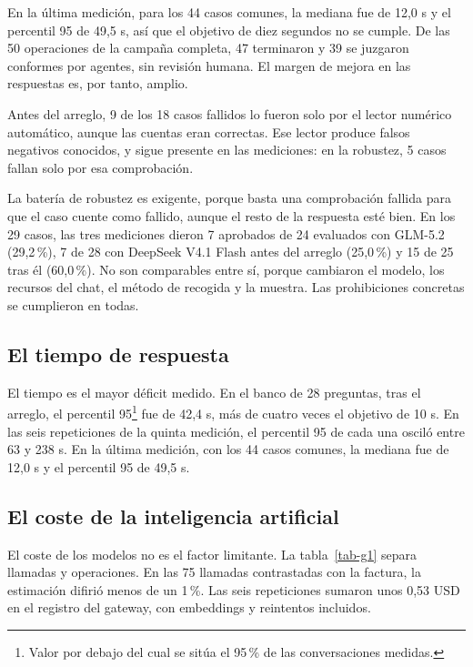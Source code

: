 En la última medición, para los 44 casos comunes, la mediana fue de 12,0 s y el percentil 95 de 49,5 s, así que el objetivo de diez segundos no se cumple. De las 50 operaciones de la campaña completa, 47 terminaron y 39 se juzgaron conformes por agentes, sin revisión humana. El margen de mejora en las respuestas es, por tanto, amplio.

Antes del arreglo, 9 de los 18 casos fallidos lo fueron solo por el lector numérico automático, aunque las cuentas eran correctas. Ese lector produce falsos negativos conocidos, y sigue presente en las mediciones: en la robustez, 5 casos fallan solo por esa comprobación.

La batería de robustez es exigente, porque basta una comprobación fallida para que el caso cuente como fallido, aunque el resto de la respuesta esté bien. En los 29 casos, las tres mediciones dieron 7 aprobados de 24 evaluados con GLM-5.2 (29,2\,\%), 7 de 28 con DeepSeek V4.1 Flash antes del arreglo (25,0\,\%) y 15 de 25 tras él (60,0\,\%). No son comparables entre sí, porque cambiaron el modelo, los recursos del chat, el método de recogida y la muestra. Las prohibiciones concretas se cumplieron en todas.

\subsection{El tiempo de respuesta}\label{h-4}

El tiempo es el mayor déficit medido. En el banco de 28 preguntas, tras el arreglo, el percentil 95\footnote{Valor por debajo del cual se sitúa el 95\,\% de las conversaciones medidas.} fue de 42,4 s, más de cuatro veces el objetivo de 10 s. En las seis repeticiones de la quinta medición, el percentil 95 de cada una osciló entre 63 y 238 s. En la última medición, con los 44 casos comunes, la mediana fue de 12,0 s y el percentil 95 de 49,5 s.

\subsection{El coste de la inteligencia artificial}\label{h-5}

El coste de los modelos no es el factor limitante. La tabla~\ref{tab-g1} separa llamadas y operaciones. En las 75 llamadas contrastadas con la factura, la estimación difirió menos de un 1\,\%. Las seis repeticiones sumaron unos 0,53 USD en el registro del gateway, con embeddings y reintentos incluidos. \cite{coste-chat,evaluacion}


